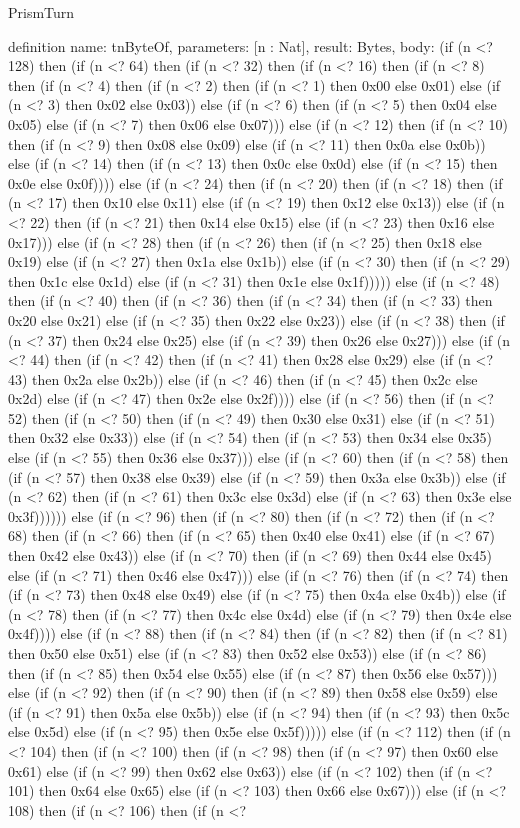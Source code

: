 \begin{lexlean}{PrismTurn}
\begin{semanticmodule}
definition{
  name: tnByteOf,
  parameters: [n : Nat],
  result: Bytes,
  body: (if (n <? 128) then (if (n <? 64) then (if (n <? 32) then (if (n <? 16) then (if (n <? 8) then (if (n <? 4) then (if (n <? 2) then (if (n <? 1) then 0x00 else 0x01) else (if (n <? 3) then 0x02 else 0x03)) else (if (n <? 6) then (if (n <? 5) then 0x04 else 0x05) else (if (n <? 7) then 0x06 else 0x07))) else (if (n <? 12) then (if (n <? 10) then (if (n <? 9) then 0x08 else 0x09) else (if (n <? 11) then 0x0a else 0x0b)) else (if (n <? 14) then (if (n <? 13) then 0x0c else 0x0d) else (if (n <? 15) then 0x0e else 0x0f)))) else (if (n <? 24) then (if (n <? 20) then (if (n <? 18) then (if (n <? 17) then 0x10 else 0x11) else (if (n <? 19) then 0x12 else 0x13)) else (if (n <? 22) then (if (n <? 21) then 0x14 else 0x15) else (if (n <? 23) then 0x16 else 0x17))) else (if (n <? 28) then (if (n <? 26) then (if (n <? 25) then 0x18 else 0x19) else (if (n <? 27) then 0x1a else 0x1b)) else (if (n <? 30) then (if (n <? 29) then 0x1c else 0x1d) else (if (n <? 31) then 0x1e else 0x1f))))) else (if (n <? 48) then (if (n <? 40) then (if (n <? 36) then (if (n <? 34) then (if (n <? 33) then 0x20 else 0x21) else (if (n <? 35) then 0x22 else 0x23)) else (if (n <? 38) then (if (n <? 37) then 0x24 else 0x25) else (if (n <? 39) then 0x26 else 0x27))) else (if (n <? 44) then (if (n <? 42) then (if (n <? 41) then 0x28 else 0x29) else (if (n <? 43) then 0x2a else 0x2b)) else (if (n <? 46) then (if (n <? 45) then 0x2c else 0x2d) else (if (n <? 47) then 0x2e else 0x2f)))) else (if (n <? 56) then (if (n <? 52) then (if (n <? 50) then (if (n <? 49) then 0x30 else 0x31) else (if (n <? 51) then 0x32 else 0x33)) else (if (n <? 54) then (if (n <? 53) then 0x34 else 0x35) else (if (n <? 55) then 0x36 else 0x37))) else (if (n <? 60) then (if (n <? 58) then (if (n <? 57) then 0x38 else 0x39) else (if (n <? 59) then 0x3a else 0x3b)) else (if (n <? 62) then (if (n <? 61) then 0x3c else 0x3d) else (if (n <? 63) then 0x3e else 0x3f)))))) else (if (n <? 96) then (if (n <? 80) then (if (n <? 72) then (if (n <? 68) then (if (n <? 66) then (if (n <? 65) then 0x40 else 0x41) else (if (n <? 67) then 0x42 else 0x43)) else (if (n <? 70) then (if (n <? 69) then 0x44 else 0x45) else (if (n <? 71) then 0x46 else 0x47))) else (if (n <? 76) then (if (n <? 74) then (if (n <? 73) then 0x48 else 0x49) else (if (n <? 75) then 0x4a else 0x4b)) else (if (n <? 78) then (if (n <? 77) then 0x4c else 0x4d) else (if (n <? 79) then 0x4e else 0x4f)))) else (if (n <? 88) then (if (n <? 84) then (if (n <? 82) then (if (n <? 81) then 0x50 else 0x51) else (if (n <? 83) then 0x52 else 0x53)) else (if (n <? 86) then (if (n <? 85) then 0x54 else 0x55) else (if (n <? 87) then 0x56 else 0x57))) else (if (n <? 92) then (if (n <? 90) then (if (n <? 89) then 0x58 else 0x59) else (if (n <? 91) then 0x5a else 0x5b)) else (if (n <? 94) then (if (n <? 93) then 0x5c else 0x5d) else (if (n <? 95) then 0x5e else 0x5f))))) else (if (n <? 112) then (if (n <? 104) then (if (n <? 100) then (if (n <? 98) then (if (n <? 97) then 0x60 else 0x61) else (if (n <? 99) then 0x62 else 0x63)) else (if (n <? 102) then (if (n <? 101) then 0x64 else 0x65) else (if (n <? 103) then 0x66 else 0x67))) else (if (n <? 108) then (if (n <? 106) then (if (n <? }
\end{semanticmodule}
\end{lexlean}
